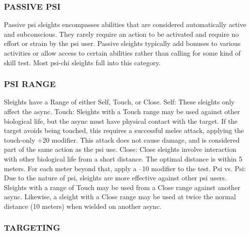 \subsubsection{PASSIVE PSI} 

Passive psi sleights encompasses abilities that are considered automatically active and subconscious. They rarely require an action to be activated and require no effort or strain by the psi user. Passive sleights typically add bonuses to various activities or allow access to certain abilities rather than calling for some kind of skill test. Most psi-chi sleights fall into this category. 

\subsubsection{PSI RANGE} 

Sleights have a Range of either Self, Touch, or Close. Self: These sleights only affect the async. Touch: Sleights with a Touch range may be used against other biological life, but the async must have physical contact with the target. If the target avoids being touched, this requires a successful melee attack, applying the touch-only +20 modifier. This attack does not cause damage, and is considered part of the same action as the psi use. Close: Close sleights involve interaction with other biological life from a short distance. The optimal distance is within 5 meters. For each meter beyond that, apply a –10 modifier to the test. Psi vs. Psi: Due to the nature of psi, sleights are more effective against other psi users. Sleights with a range of Touch may be used from a Close range against another async. Likewise, a sleight with a Close range may be used at twice the normal distance (10 meters) when wielded on another async. 

\subsubsection{TARGETING} 

